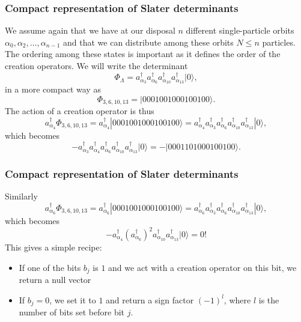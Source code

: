 \documentclass[compress]{beamer}
\newcommand*{\ket}[1]{|#1\rangle}
\begin{document}
\frame
{
  \frametitle{Compact representation of Slater determinants}
\begin{small}
{\scriptsize
We assume again that we have at our disposal $n$ different single-particle orbits
$\alpha_0,\alpha_2,\dots,\alpha_{n-1}$ and that we can distribute  among these orbits $N\le n$ particles.
The ordering among these states is important as it defines the order of the creation operators.
We will write the determinant 
\[
\Phi_{\Lambda} = a_{\alpha_3}^\dagger a_{\alpha_6}^\dagger a_{\alpha_{10}}^\dagger a_{\alpha_{13}}^\dagger \ket{0},
\]
in a more compact way as 
\[
\Phi_{3,6,10,13} = |0001001000100100\rangle.
\]
The action of a creation operator is thus
\[
a^\dagger_{\alpha_4}\Phi_{3,6,10,13} = a^\dagger_{\alpha_4}|0001001000100100\rangle=a^\dagger_{\alpha_4}a_{\alpha_3}^\dagger a_{\alpha_6}^\dagger a_{\alpha_{10}}^\dagger a_{\alpha_{13}}^\dagger \ket{0},
\]
which becomes
\[
-a_{\alpha_3}^\dagger a^\dagger_{\alpha_4} a_{\alpha_6}^\dagger a_{\alpha_{10}}^\dagger a_{\alpha_{13}}^\dagger \ket{0}=-|0001101000100100\rangle.
\]
}
\end{small}
}


\frame
{
  \frametitle{Compact representation of Slater determinants}
\begin{small}
{\scriptsize
Similarly
\[
a^\dagger_{\alpha_6}\Phi_{3,6,10,13} = a^\dagger_{\alpha_6}|0001001000100100\rangle=a^\dagger_{\alpha_6}a_{\alpha_3}^\dagger a_{\alpha_6}^\dagger a_{\alpha_{10}}^\dagger a_{\alpha_{13}}^\dagger \ket{0},
\]
which becomes
\[
-a^\dagger_{\alpha_4} (a_{\alpha_6}^\dagger)^ 2 a_{\alpha_{10}}^\dagger a_{\alpha_{13}}^\dagger \ket{0}=0!
\]
This gives a simple recipe:  
\begin{itemize}
\item If one of the bits $b_j$ is $1$ and we act with a creation operator on this bit, we return a null vector
\item  If $b_j=0$, we set it to $1$ and return a sign factor $(-1)^l$, where $l$ is the number of bits set before bit $j$.
\end{itemize}
}
\end{small}
}
\end{document}
